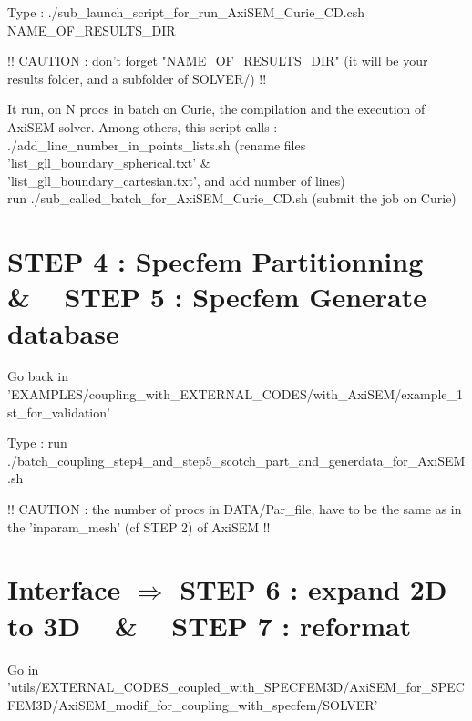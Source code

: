 \documentclass[11pt]{article}
\begin{document}
\medskip

\noindent Type : ./sub\_launch\_script\_for\_run\_AxiSEM\_Curie\_CD.csh NAME\_OF\_RESULTS\_DIR

\smallskip

\noindent !! CAUTION : don't forget "NAME\_OF\_RESULTS\_DIR" (it will be your results folder, and a subfolder of SOLVER/) !!

\smallskip

\noindent It run, on N procs in batch on Curie, the compilation and the execution of  AxiSEM solver.
Among others, this script calls : \\

\noindent ./add\_line\_number\_in\_points\_lists.sh (rename files 'list\_gll\_boundary\_spherical.txt' \& \\ 'list\_gll\_boundary\_cartesian.txt', and add number of lines) \\

\noindent run ./sub\_called\_batch\_for\_AxiSEM\_Curie\_CD.sh (submit the job on Curie)


\section{STEP 4 : Specfem Partitionning ~ \& ~ STEP 5 : Specfem Generate database}

\noindent Go back in 'EXAMPLES/coupling\_with\_EXTERNAL\_CODES/with\_AxiSEM/example\_1st\_for\_validation'

\medskip

\noindent Type : run ./batch\_coupling\_step4\_and\_step5\_scotch\_part\_and\_generdata\_for\_AxiSEM.sh

\medskip

\noindent !! CAUTION : the number of procs in DATA/Par\_file, have to be the same as in the 'inparam\_mesh' (cf STEP 2) of AxiSEM !!


\section{Interface $\Longrightarrow$ STEP 6 : expand 2D to 3D ~ \& ~ STEP 7 : reformat}

\noindent Go in {\scriptsize 'utils/EXTERNAL\_CODES\_coupled\_with\_SPECFEM3D/AxiSEM\_for\_SPECFEM3D/AxiSEM\_modif\_for\_coupling\_with\_specfem/SOLVER'}

\medskip
\end{document}
